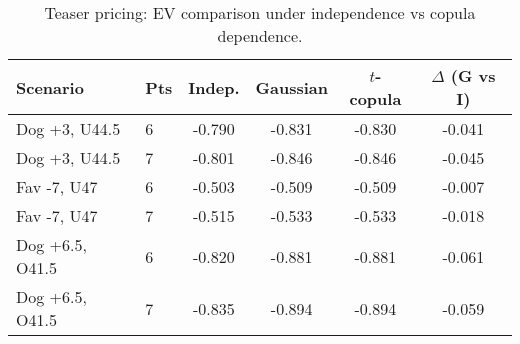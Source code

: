 \begin{table}[t]
  \centering
  \small
  \caption{Teaser pricing: EV comparison under independence vs copula dependence.}
  \label{tab:teaser-ev-oos}
  \begin{tabular}{llcccc}
    \toprule
    Scenario & Pts & Indep. & Gaussian & $t$-copula & $\Delta$ (G vs I) \\
    \midrule
    Dog +3, U44.5 & 6 & -0.790 & -0.831 & -0.830 & -0.041 \\
    Dog +3, U44.5 & 7 & -0.801 & -0.846 & -0.846 & -0.045 \\
    Fav -7, U47 & 6 & -0.503 & -0.509 & -0.509 & -0.007 \\
    Fav -7, U47 & 7 & -0.515 & -0.533 & -0.533 & -0.018 \\
    Dog +6.5, O41.5 & 6 & -0.820 & -0.881 & -0.881 & -0.061 \\
    Dog +6.5, O41.5 & 7 & -0.835 & -0.894 & -0.894 & -0.059 \\
    \bottomrule
  \end{tabular}
\end{table}